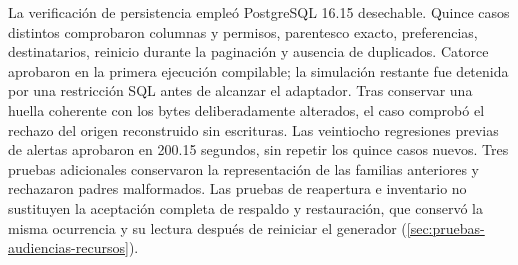 La verificación de persistencia empleó PostgreSQL 16.15 desechable. Quince casos distintos comprobaron columnas y permisos, parentesco exacto, preferencias, destinatarios, reinicio durante la paginación y ausencia de duplicados. Catorce aprobaron en la primera ejecución compilable; la simulación restante fue detenida por una restricción SQL antes de alcanzar el adaptador. Tras conservar una huella coherente con los bytes deliberadamente alterados, el caso comprobó el rechazo del origen reconstruido sin escrituras. Las veintiocho regresiones previas de alertas aprobaron en 200.15 segundos, sin repetir los quince casos nuevos. Tres pruebas adicionales conservaron la representación de las familias anteriores y rechazaron padres malformados. Las pruebas de reapertura e inventario no sustituyen la aceptación completa de respaldo y restauración, que conservó la misma ocurrencia y su lectura después de reiniciar el generador (\cref{sec:pruebas-audiencias-recursos}).
